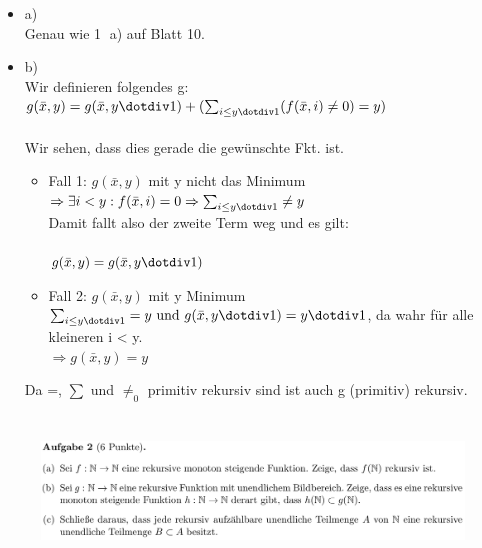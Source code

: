 \documentclass[a4paper]{scrartcl}%
\begin{document}
    \begin{itemize}
        \item a)\\
            Genau wie \textcircled{1} a) auf Blatt 10. 
        \item b)\\
            Wir definieren folgendes g:\\
            $g(\bar{x}, y) =\\
            g(\bar{x}, y \dotdiv 1) + (\sum_{i \leq y \dotdiv 1}(f(\bar{x}, i) \neq 0) = y)$\\
            \\
            Wir sehen, dass dies gerade die gewünschte Fkt. ist.\\
            \begin{itemize}
                \item Fall 1: $g(\bar{x},y)$ mit y nicht das Minimum\\
                    $\Rightarrow \exists i<y: f(\bar{x}, i) = 0 \Rightarrow \sum_{i \leq y \dotdiv 1} \neq y$\\
                    Damit fallt also der zweite Term weg und es gilt:\\
                    \\$g(\bar{x},y) = g(\bar{x},y\dotdiv 1)$\\
                \item Fall 2: $g(\bar{x}, y)$ mit y Minimum\\
                    $\sum_{i \leq y \dotdiv 1} = y \text{ und } g(\bar{x},y\dotdiv 1) = y \dotdiv 1$, da wahr für alle kleineren i < y.\\
                    $\Rightarrow g(\bar{x},y) = y$\\
            \end{itemize}
            Da =, $\sum$ und $\neq_0$ primitiv rekursiv sind ist auch g (primitiv) rekursiv.\\
    \end{itemize}%

\newpage

\section*{}%
\label{sec:aufgabe_2}

    \begin{figure}[H]
        \includegraphics[scale=0.3]{./A-2.png}
        \label{fig:}
    \end{figure}
\end{document}
